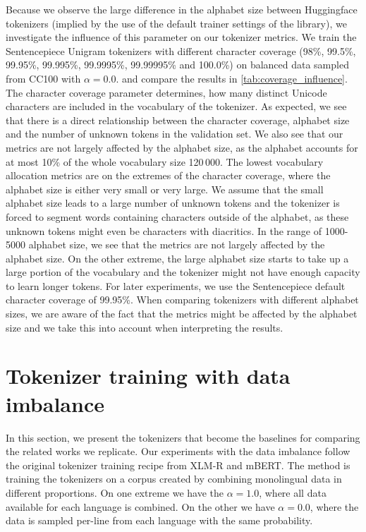 

Because we observe the large difference in the alphabet size between Huggingface tokenizers (implied by the use of the default trainer settings of the library), we investigate the influence of this parameter on our tokenizer metrics. We train the Sentencepiece Unigram tokenizers with different character coverage (98\%, 99.5\%, 99.95\%, 99.995\%, 99.9995\%, 99.99995\% and 100.0\%) on balanced data sampled from CC100 with $\alpha=0.0$. and compare the results in \autoref{tab:coverage_influence}. The character coverage parameter determines, how many distinct Unicode characters are included in the vocabulary of the tokenizer. As expected, we see that there is a direct relationship between the character coverage, alphabet size and the number of unknown tokens in the validation set. We also see that our metrics are not largely affected by the alphabet size, as the alphabet accounts for at most 10\% of the whole vocabulary size 120\,000. The lowest vocabulary allocation metrics are on the extremes of the character coverage, where the alphabet size is either very small or very large. We assume that the small alphabet size leads to a large number of unknown tokens and the tokenizer is forced to segment words containing characters outside of the alphabet, as these unknown tokens might even be characters with diacritics. In the range of 1000-5000 alphabet size, we see that the metrics are not largely affected by the alphabet size. On the other extreme, the large alphabet size starts to take up a large portion of the vocabulary and the tokenizer might not have enough capacity to learn longer tokens. For later experiments, we use the Sentencepiece default character coverage of 99.95\%. When comparing tokenizers with different alphabet sizes, we are aware of the fact that the metrics might be affected by the alphabet size and we take this into account when interpreting the results.

\section{Tokenizer training with data imbalance}
\label{sec:tokenizer_training_with_data_imbalance}



In this section, we present the tokenizers that become the baselines for comparing the related works we replicate. Our experiments with the data imbalance follow the original tokenizer training recipe from XLM-R and mBERT. The method is training the tokenizers on a corpus created by combining monolingual data in different proportions. On one extreme we have the $\alpha=1.0$, where all data available for each language is combined. On the other we have $\alpha=0.0$, where the data is sampled per-line from each language with the same probability. 


